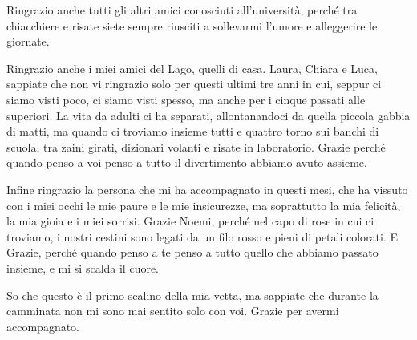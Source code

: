 \begin{dedication}
  Ringrazio anche tutti gli altri amici conosciuti all'università, perché tra chiacchiere e risate siete sempre riusciti a sollevarmi l'umore e alleggerire le giornate.

  Ringrazio anche i miei amici del Lago, quelli di casa. Laura, Chiara e Luca, sappiate che non vi ringrazio solo per questi ultimi tre anni in cui, seppur ci siamo visti poco, ci siamo visti spesso, ma anche per i cinque passati alle superiori. La vita da adulti ci ha separati, allontanandoci da quella piccola gabbia di matti, ma quando ci troviamo insieme tutti e quattro torno sui banchi di scuola, tra zaini girati, dizionari volanti e risate in laboratorio. Grazie perché quando penso a voi penso a tutto il divertimento abbiamo avuto assieme.
  
  
  Infine ringrazio la persona che mi ha accompagnato in questi mesi, che ha vissuto con i miei occhi le mie paure e le mie insicurezze, ma soprattutto la mia felicità, la mia gioia e i miei sorrisi. Grazie Noemi, perché nel capo di rose in cui ci troviamo, i nostri cestini sono legati da un filo rosso e pieni di petali colorati. E Grazie, perché quando penso a te penso a tutto quello che abbiamo passato insieme, e mi si scalda il cuore.
  
  \vspace{2cm}
  
  So che questo è il primo scalino della mia vetta, ma sappiate che durante la camminata non mi sono mai sentito solo con voi. Grazie per avermi accompagnato. 
\end{dedication}
